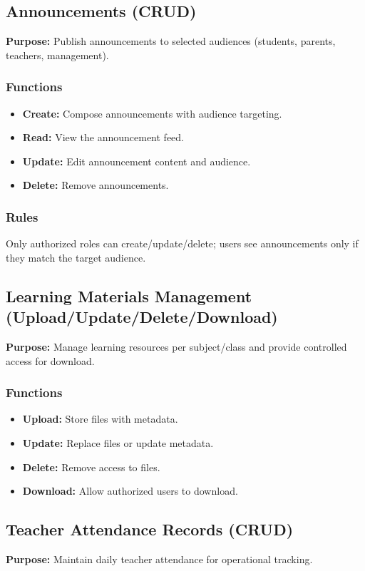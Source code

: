 \documentclass[12pt, a4paper]{report}
\begin{document}
\subsection{Announcements (CRUD)}
\textbf{Purpose:} Publish announcements to selected audiences (students, parents, teachers, management).

\subsubsection*{Functions}
\begin{itemize}[leftmargin=*]
  \item \textbf{Create:} Compose announcements with audience targeting.
  \item \textbf{Read:} View the announcement feed.
  \item \textbf{Update:} Edit announcement content and audience.
  \item \textbf{Delete:} Remove announcements.
\end{itemize}

\subsubsection*{Rules}
Only authorized roles can create/update/delete; users see announcements only if they match the target audience.

\subsection{Learning Materials Management (Upload/Update/Delete/Download)}
\textbf{Purpose:} Manage learning resources per subject/class and provide controlled access for download.

\subsubsection*{Functions}
\begin{itemize}[leftmargin=*]
  \item \textbf{Upload:} Store files with metadata.
  \item \textbf{Update:} Replace files or update metadata.
  \item \textbf{Delete:} Remove access to files.
  \item \textbf{Download:} Allow authorized users to download.
\end{itemize}

\subsection{Teacher Attendance Records (CRUD)}
\textbf{Purpose:} Maintain daily teacher attendance for operational tracking.
\end{document}
